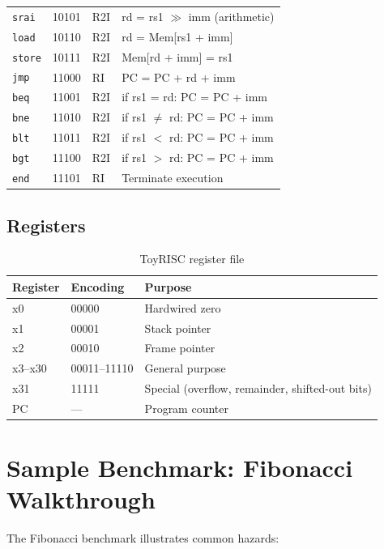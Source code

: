 \documentclass[12pt,a4paper]{article}
\begin{document}
\begin{longtable}{@{}lllp{6cm}@{}}
\texttt{srai} & 10101 & R2I  & rd = rs1 $\gg$ imm (arithmetic) \\
\texttt{load} & 10110 & R2I  & rd = Mem[rs1 + imm] \\
\texttt{store}& 10111 & R2I  & Mem[rd + imm] = rs1 \\
\texttt{jmp}  & 11000 & RI   & PC = PC + rd + imm \\
\texttt{beq}  & 11001 & R2I  & if rs1 = rd: PC = PC + imm \\
\texttt{bne}  & 11010 & R2I  & if rs1 $\neq$ rd: PC = PC + imm \\
\texttt{blt}  & 11011 & R2I  & if rs1 $<$ rd: PC = PC + imm \\
\texttt{bgt}  & 11100 & R2I  & if rs1 $>$ rd: PC = PC + imm \\
\texttt{end}  & 11101 & RI   & Terminate execution \\
\bottomrule
\end{longtable}

\subsection{Registers}

\begin{table}[H]
\centering
\begin{tabular}{@{}lll@{}}
\toprule
\textbf{Register} & \textbf{Encoding} & \textbf{Purpose} \\
\midrule
x0 & 00000 & Hardwired zero \\
x1 & 00001 & Stack pointer \\
x2 & 00010 & Frame pointer \\
x3--x30 & 00011--11110 & General purpose \\
x31 & 11111 & Special (overflow, remainder, shifted-out bits) \\
PC & --- & Program counter \\
\bottomrule
\end{tabular}
\caption{ToyRISC register file}
\end{table}

\section{Sample Benchmark: Fibonacci Walkthrough}

The Fibonacci benchmark illustrates common hazards:
\end{document}
